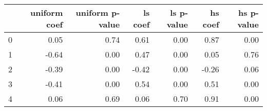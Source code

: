 \begin{tabular}{lrrrrrr}
\toprule
 & uniform coef & uniform p-value & ls coef & ls p-value & hs coef & hs p-value \\
\midrule
0 & 0.05 & 0.74 & 0.61 & 0.00 & 0.87 & 0.00 \\
1 & -0.64 & 0.00 & 0.47 & 0.00 & 0.05 & 0.76 \\
2 & -0.39 & 0.00 & -0.42 & 0.00 & -0.26 & 0.06 \\
3 & -0.41 & 0.00 & 0.54 & 0.00 & 0.51 & 0.00 \\
4 & 0.06 & 0.69 & 0.06 & 0.70 & 0.91 & 0.00 \\
\bottomrule
\end{tabular}
